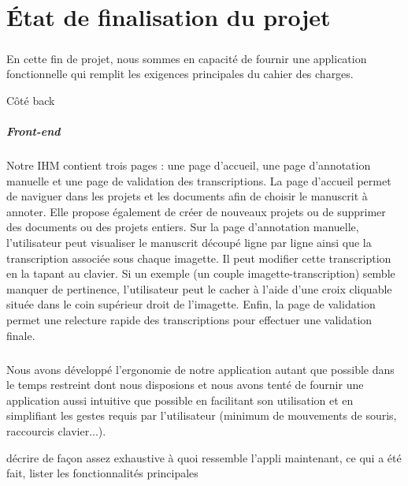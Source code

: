 \chapter{État de finalisation du projet}

\paragraph{}
En cette fin de projet, nous sommes en capacité de fournir une application fonctionnelle qui remplit les exigences principales du cahier des charges.

Côté back

\paragraph{Front-end}
Notre IHM contient trois pages : une page d'accueil, une page d'annotation manuelle et une page de validation des transcriptions.
\newline
La page d'accueil permet de naviguer dans les projets et les documents afin de choisir le manuscrit à annoter. Elle propose également de créer de nouveaux projets ou de supprimer des documents ou des projets entiers.
\newline
Sur la page d'annotation manuelle, l'utilisateur peut visualiser le manuscrit découpé ligne par ligne ainsi que la transcription associée sous chaque imagette. Il peut modifier cette transcription en la tapant au clavier. Si un exemple (un couple imagette-transcription) semble manquer de pertinence, l'utilisateur peut le cacher à l'aide d'une croix cliquable située dans le coin supérieur droit de l'imagette.
\newline
Enfin, la page de validation permet une relecture rapide des transcriptions pour effectuer une validation finale.

\paragraph{}
Nous avons développé l'ergonomie de notre application autant que possible dans le temps restreint dont nous disposions et nous avons tenté de fournir une application aussi intuitive que possible en facilitant son utilisation et en simplifiant les gestes requis par l'utilisateur (minimum de mouvements de souris, raccourcis clavier...).



décrire de façon assez exhaustive à quoi ressemble l'appli maintenant, ce qui a été fait, lister les fonctionnalités principales